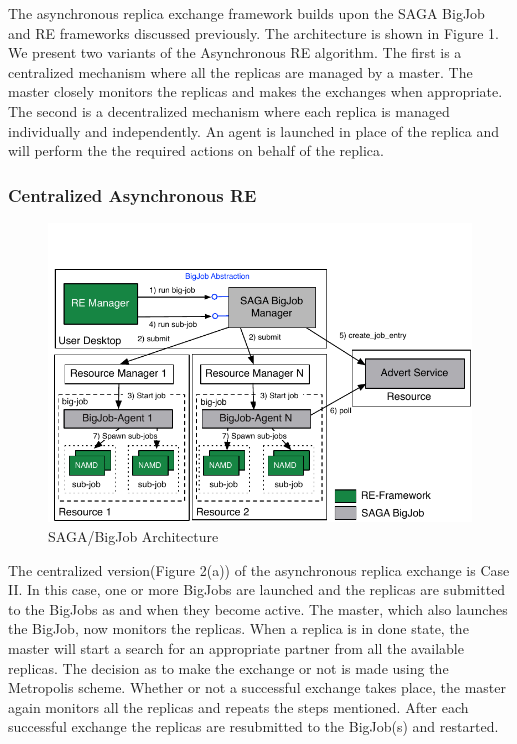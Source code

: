 \documentclass[a4paper,10pt]{article}
\newcommand{\alnote}[1]{ {\textcolor{blue} { ***andre: #1 }}}
\newcommand{\alnote}[1]{}
\begin{document}

The asynchronous replica exchange framework builds upon the SAGA BigJob and RE frameworks discussed previously.
The architecture is shown in Figure 1.
We present two variants of the Asynchronous RE algorithm. The first is a centralized 
mechanism where all the replicas are managed by a master. The master closely monitors the replicas and makes the exchanges when appropriate. 
The second is a decentralized mechanism where each replica is managed individually and independently. An agent is launched in place of the replica and will perform the the required actions on behalf of the replica.


\subsubsection{Centralized Asynchronous RE}

\begin{figure}
\centering
\includegraphics[scale=0.6]{figures/Bigjob_arch.pdf}
\caption{\small SAGA/BigJob Architecture}
\label{fig:centralized}
\end{figure}

The centralized version(Figure 2(a)) of the asynchronous replica exchange is Case II. In this case, one or more BigJobs are
launched and the replicas are submitted to the BigJobs as and when they become active. The master, which also launches the BigJob,
now monitors the replicas. When a replica is in done state, the master will start a search for an appropriate partner from all the available replicas. The decision as to make the exchange or not is made using the Metropolis scheme. 
Whether or not a successful exchange takes place, the master again monitors all the replicas and  repeats the steps mentioned.
After each successful exchange the replicas are resubmitted to the BigJob(s) and restarted.
\end{document}
